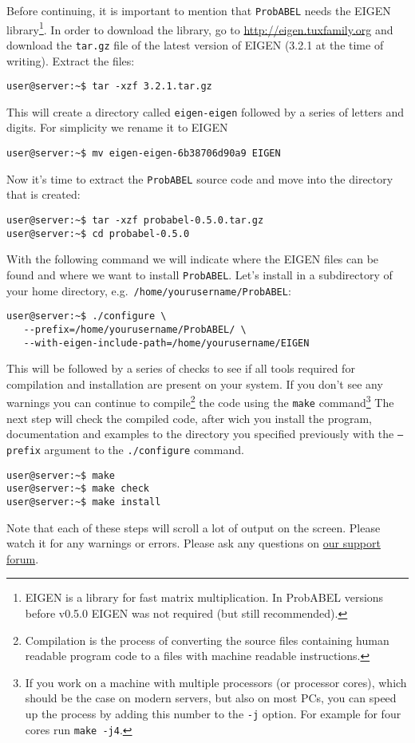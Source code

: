 \documentclass[12pt,a4paper]{article}
\newcommand{\PA}{\texttt{ProbABEL}}
\begin{document}
Before continuing, it is important to mention that \PA{} needs the
EIGEN library\footnote{EIGEN is a library for fast matrix
  multiplication. In ProbABEL versions before v0.5.0 EIGEN was not
  required (but still recommended).}. In order to download the
library, go to \url{http://eigen.tuxfamily.org} and download the
\texttt{tar.gz} file of the latest version of EIGEN (3.2.1 at the time
of writing). Extract the files:
\begin{lstlisting}
user@server:~$ tar -xzf 3.2.1.tar.gz
\end{lstlisting}
This will create a directory called \texttt{eigen-eigen} followed by a
series of letters and digits. For simplicity we rename it to EIGEN
\begin{lstlisting}
user@server:~$ mv eigen-eigen-6b38706d90a9 EIGEN
\end{lstlisting}

Now it's time to extract the \PA{} source code and move into the
directory that is created:
\begin{lstlisting}
user@server:~$ tar -xzf probabel-0.5.0.tar.gz
user@server:~$ cd probabel-0.5.0
\end{lstlisting}
With the following command we will indicate where the EIGEN files can
be found and where we want to install \PA{}. Let's install in a
subdirectory of your home directory,
e.g.~\texttt{/home/yourusername/ProbABEL}:
\begin{lstlisting}
user@server:~$ ./configure \
   --prefix=/home/yourusername/ProbABEL/ \
   --with-eigen-include-path=/home/yourusername/EIGEN
\end{lstlisting}
This will be followed by a series of checks to see if all tools
required for compilation and installation are present on your
system. If you don't see any warnings you can continue to
compile\footnote{Compilation is the process of converting the source
  files containing human readable program code to a files with machine
  readable instructions.} the code using the \texttt{make}
command\footnote{If you work on a machine with multiple processors (or
  processor cores), which should be the case on modern servers, but
  also on most PCs, you can speed up the process by adding this number
  to the \texttt{-j} option. For example for four cores run
  \texttt{make -j4}.} The next step will check the compiled code,
after wich you install the program, documentation and examples to the
directory you specified previously with the \texttt{--prefix} argument
to the \texttt{./configure} command.
\begin{lstlisting}
user@server:~$ make
user@server:~$ make check
user@server:~$ make install
\end{lstlisting}
Note that each of these steps will scroll a lot of output on the
screen. Please watch it for any warnings or errors. Please ask any
questions on \href{http://forum.genabel.org/}{our support forum}.
\end{document}
